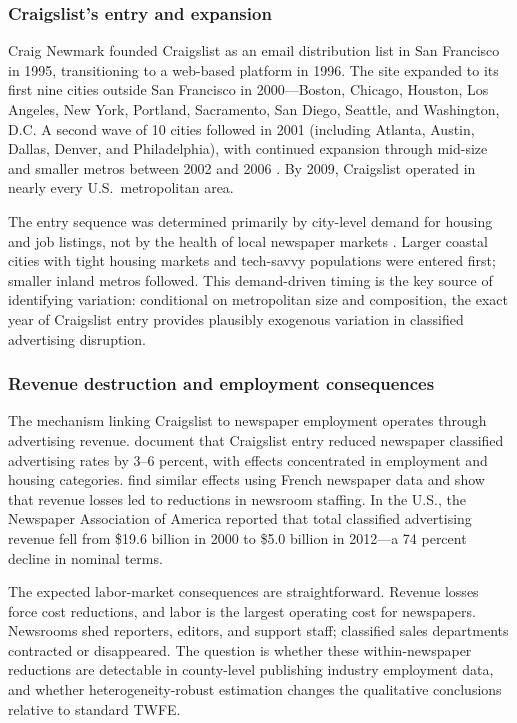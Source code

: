 \documentclass[12pt]{article}
\begin{document}
\subsubsection*{Craigslist's entry and expansion} Craig Newmark founded Craigslist as an email distribution list in San Francisco in 1995, transitioning to a web-based platform in 1996. The site expanded to its first nine cities outside San Francisco in 2000---Boston, Chicago, Houston, Los Angeles, New York, Portland, Sacramento, San Diego, Seattle, and Washington, D.C. A second wave of 10 cities followed in 2001 (including Atlanta, Austin, Dallas, Denver, and Philadelphia), with continued expansion through mid-size and smaller metros between 2002 and 2006 \citep{kroft_pope_2014}. By 2009, Craigslist operated in nearly every U.S.\ metropolitan area.

The entry sequence was determined primarily by city-level demand for housing and job listings, not by the health of local newspaper markets \citep{seamans_zhu_2014}. Larger coastal cities with tight housing markets and tech-savvy populations were entered first; smaller inland metros followed. This demand-driven timing is the key source of identifying variation: conditional on metropolitan size and composition, the exact year of Craigslist entry provides plausibly exogenous variation in classified advertising disruption.

\subsubsection*{Revenue destruction and employment consequences} The mechanism linking Craigslist to newspaper employment operates through advertising revenue. \citet{seamans_zhu_2014} document that Craigslist entry reduced newspaper classified advertising rates by 3--6 percent, with effects concentrated in employment and housing categories. \citet{cage_sraer_2022} find similar effects using French newspaper data and show that revenue losses led to reductions in newsroom staffing. In the U.S., the Newspaper Association of America reported that total classified advertising revenue fell from \$19.6 billion in 2000 to \$5.0 billion in 2012---a 74 percent decline in nominal terms.

The expected labor-market consequences are straightforward. Revenue losses force cost reductions, and labor is the largest operating cost for newspapers. Newsrooms shed reporters, editors, and support staff; classified sales departments contracted or disappeared. The question is whether these within-newspaper reductions are detectable in county-level publishing industry employment data, and whether heterogeneity-robust estimation changes the qualitative conclusions relative to standard TWFE.
\end{document}
